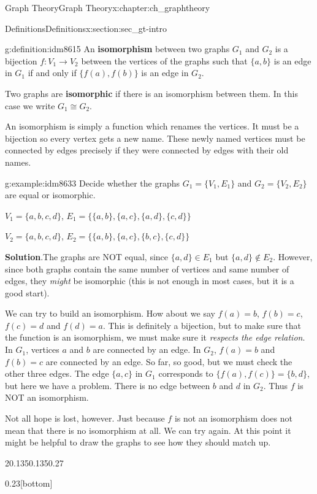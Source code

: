 \documentclass[oneside,10pt,]{book}
\newcommand{\terminology}[1]{\textbf{#1}}
\numberwithin{equation}{chapter}
\def\isom{\cong}
\begin{document}
\begin{chapterptx}{Graph Theory}{}{Graph Theory}{}{}{x:chapter:ch_graphtheory}
\begin{sectionptx}{Definitions}{}{Definitions}{}{}{x:section:sec_gt-intro}
\begin{definition}{}{g:definition:idm8615}%
 An \terminology{isomorphism} between two graphs \(G_1\) and \(G_2\) is a bijection \(f:V_1 \to V_2\) between the vertices of the graphs such that \(\{a,b\}\) is an edge in \(G_1\) if and only if \(\{f(a), f(b)\}\) is an edge in \(G_2\).%
\par
Two graphs are \terminology{isomorphic} if there is an isomorphism between them. In this case we write \(G_1 \isom G_2\).%
\end{definition}
An isomorphism is simply a function which renames the vertices. It must be a bijection so every vertex gets a new name. These newly named vertices must be connected by edges precisely if they were connected by edges with their old names.%
\begin{example}{}{g:example:idm8633}%
Decide whether the graphs \(G_1 = \{V_1, E_1\}\) and \(G_2 = \{V_2, E_2\}\) are equal or isomorphic.%
\par
\(V_1 = \{a,b,c,d\}\), \(E_1 = \{\{a,b\}, \{a,c\}, \{a,d\}, \{c,d\}\}\)%
\par
\(V_2 = \{a,b,c,d\}\), \(E_2 = \{\{a,b\}, \{a,c\}, \{b,c\}, \{c,d\}\}\)%
\par\smallskip%
\noindent\textbf{Solution}.\hypertarget{g:solution:idm8644}{}\quad{}The graphs are NOT equal, since \(\{a,d\} \in E_1\) but \(\{a,d\} \notin E_2\). However, since both graphs contain the same number of vertices and same number of edges, they \emph{might} be isomorphic (this is not enough in most cases, but it is a good start).%
\par
We can try to build an isomorphism. How about we say \(f(a) = b\), \(f(b) = c\), \(f(c) = d\) and \(f(d) = a\). This is definitely a bijection, but to make sure that the function is an isomorphism, we must make sure it \emph{respects the edge relation}. In \(G_1\), vertices \(a\) and \(b\) are connected by an edge. In \(G_2\), \(f(a) = b\) and \(f(b) = c\) are connected by an edge. So far, so good, but we must check the other three edges. The edge \(\{a,c\}\) in \(G_1\) corresponds to \(\{f(a), f(c)\} = \{b,d\}\), but here we have a problem. There is no edge between \(b\) and \(d\) in \(G_2\). Thus \(f\) is NOT an isomorphism.%
\par
Not all hope is lost, however. Just because \(f\) is not an isomorphism does not mean that there is no isomorphism at all. We can try again. At this point it might be helpful to draw the graphs to see how they should match up.%
\begin{sidebyside}{2}{0.135}{0.135}{0.27}%
\begin{sbspanel}{0.23}[bottom]%
\end{sbspanel}
\end{sidebyside}
\end{example}
\end{sectionptx}
\end{chapterptx}
\end{document}
